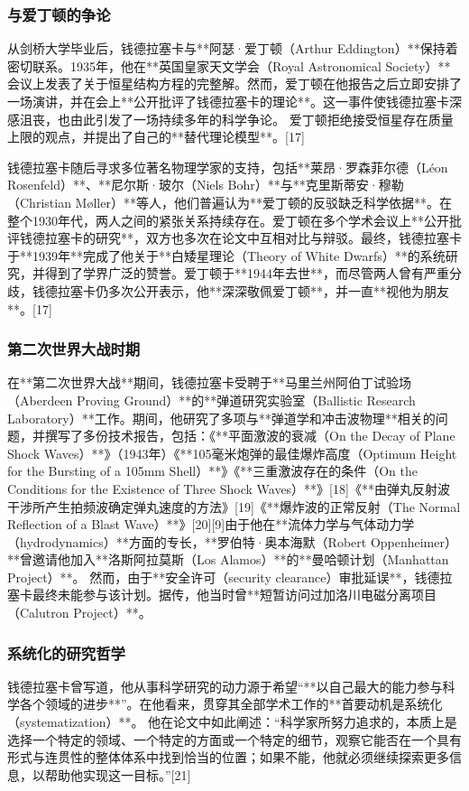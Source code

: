 \subsubsection{与爱丁顿的争论}
从剑桥大学毕业后，钱德拉塞卡与**阿瑟·爱丁顿（Arthur Eddington）**保持着密切联系。1935年，他在**英国皇家天文学会（Royal Astronomical Society）**会议上发表了关于恒星结构方程的完整解。然而，爱丁顿在他报告之后立即安排了一场演讲，并在会上**公开批评了钱德拉塞卡的理论**。这一事件使钱德拉塞卡深感沮丧，也由此引发了一场持续多年的科学争论。
爱丁顿拒绝接受恒星存在质量上限的观点，并提出了自己的**替代理论模型**。[17]

钱德拉塞卡随后寻求多位著名物理学家的支持，包括**莱昂·罗森菲尔德（Léon Rosenfeld）**、**尼尔斯·玻尔（Niels Bohr）**与**克里斯蒂安·穆勒（Christian Møller）**等人，他们普遍认为**爱丁顿的反驳缺乏科学依据**。在整个1930年代，两人之间的紧张关系持续存在。爱丁顿在多个学术会议上**公开批评钱德拉塞卡的研究**，双方也多次在论文中互相对比与辩驳。最终，钱德拉塞卡于**1939年**完成了他关于**白矮星理论（Theory of White Dwarfs）**的系统研究，并得到了学界广泛的赞誉。爱丁顿于**1944年去世**，而尽管两人曾有严重分歧，钱德拉塞卡仍多次公开表示，他**深深敬佩爱丁顿**，并一直**视他为朋友**。[17]
\subsubsection{第二次世界大战时期}
在**第二次世界大战**期间，钱德拉塞卡受聘于**马里兰州阿伯丁试验场（Aberdeen Proving Ground）**的**弹道研究实验室（Ballistic Research Laboratory）**工作。期间，他研究了多项与**弹道学和冲击波物理**相关的问题，并撰写了多份技术报告，包括：《**平面激波的衰减（On the Decay of Plane Shock Waves）**》（1943年）《**105毫米炮弹的最佳爆炸高度（Optimum Height for the Bursting of a 105mm Shell）**》《**三重激波存在的条件（On the Conditions for the Existence of Three Shock Waves）**》[18]《**由弹丸反射波干涉所产生拍频波确定弹丸速度的方法》[19]《**爆炸波的正常反射（The Normal Reflection of a Blast Wave）**》[20][9]由于他在**流体力学与气体动力学（hydrodynamics）**方面的专长，**罗伯特·奥本海默（Robert Oppenheimer）**曾邀请他加入**洛斯阿拉莫斯（Los Alamos）**的**曼哈顿计划（Manhattan Project）**。
然而，由于**安全许可（security clearance）审批延误**，钱德拉塞卡最终未能参与该计划。据传，他当时曾**短暂访问过加洛川电磁分离项目（Calutron Project）**。
\subsubsection{系统化的研究哲学}
钱德拉塞卡曾写道，他从事科学研究的动力源于希望“**以自己最大的能力参与科学各个领域的进步**”。在他看来，贯穿其全部学术工作的**首要动机是系统化（systematization）**。
他在论文中如此阐述：“科学家所努力追求的，本质上是选择一个特定的领域、一个特定的方面或一个特定的细节，观察它能否在一个具有形式与连贯性的整体体系中找到恰当的位置；如果不能，他就必须继续探索更多信息，以帮助他实现这一目标。”[21]

